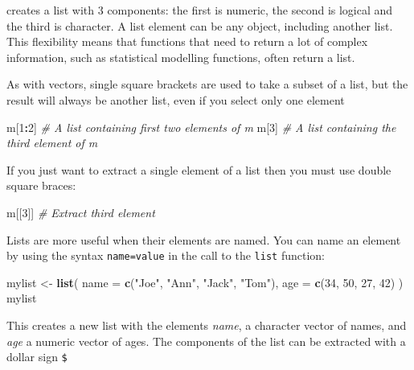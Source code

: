 \documentclass[
]{book}
\newenvironment{Shaded}{\begin{snugshade}}{\end{snugshade}}
\newcommand{\AttributeTok}[1]{\textcolor[rgb]{0.13,0.29,0.53}{#1}}
\newcommand{\CommentTok}[1]{\textcolor[rgb]{0.56,0.35,0.01}{\textit{#1}}}
\newcommand{\DecValTok}[1]{\textcolor[rgb]{0.00,0.00,0.81}{#1}}
\newcommand{\FunctionTok}[1]{\textcolor[rgb]{0.13,0.29,0.53}{\textbf{#1}}}
\newcommand{\NormalTok}[1]{#1}
\newcommand{\OtherTok}[1]{\textcolor[rgb]{0.56,0.35,0.01}{#1}}
\newcommand{\SpecialCharTok}[1]{\textcolor[rgb]{0.81,0.36,0.00}{\textbf{#1}}}
\newcommand{\StringTok}[1]{\textcolor[rgb]{0.31,0.60,0.02}{#1}}
\begin{document}
creates a list with 3 components: the first is numeric, the second
is logical and the third is character. A list element can be any
object, including another list. This flexibility means that functions
that need to return a lot of complex information, such as statistical
modelling functions, often return a list.

As with vectors, single square brackets are used to take a subset of a
list, but the result will always be another list, even if you select
only one element

\begin{Shaded}
\begin{Highlighting}[]
\NormalTok{m[}\DecValTok{1}\SpecialCharTok{:}\DecValTok{2}\NormalTok{] }\CommentTok{\# A list containing first two elements of m}
\NormalTok{m[}\DecValTok{3}\NormalTok{] }\CommentTok{\# A list containing the third element of m}
\end{Highlighting}
\end{Shaded}

If you just want to extract a single element of a list then you must use
double square braces:

\begin{Shaded}
\begin{Highlighting}[]
\NormalTok{m[[}\DecValTok{3}\NormalTok{]] }\CommentTok{\# Extract third element}
\end{Highlighting}
\end{Shaded}

Lists are more useful when their elements are named. You can name an element
by using the syntax \texttt{name=value} in the call to the \texttt{list} function:

\begin{Shaded}
\begin{Highlighting}[]
\NormalTok{mylist }\OtherTok{\textless{}{-}} \FunctionTok{list}\NormalTok{(}
  \AttributeTok{name =} \FunctionTok{c}\NormalTok{(}\StringTok{"Joe"}\NormalTok{, }\StringTok{"Ann"}\NormalTok{, }\StringTok{"Jack"}\NormalTok{, }\StringTok{"Tom"}\NormalTok{),}
  \AttributeTok{age =} \FunctionTok{c}\NormalTok{(}\DecValTok{34}\NormalTok{, }\DecValTok{50}\NormalTok{, }\DecValTok{27}\NormalTok{, }\DecValTok{42}\NormalTok{)}
\NormalTok{)}
\NormalTok{mylist}
\end{Highlighting}
\end{Shaded}

This creates a new list with the elements \emph{name}, a character
vector of names, and \emph{age} a numeric vector of ages. The components
of the list can be extracted with a dollar sign \texttt{\$}
\end{document}
